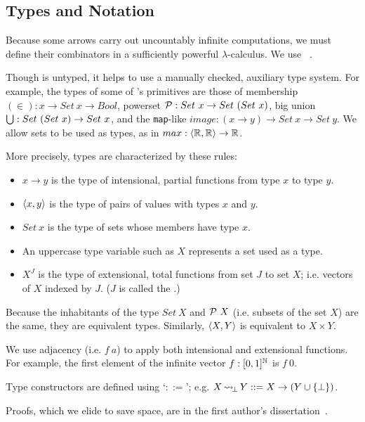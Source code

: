 \documentclass{llncs}
\newcommand{\arrow}{\rightsquigarrow}
\DeclareMathOperator{\botto}{{\arrow\mspace{-3mu}}_\bot}
\begin{document}
\subsection{Types and Notation}

Because some arrows carry out uncountably infinite computations, we must define their combinators in a sufficiently powerful $\lambda$-calculus.
We use \lzfclang~\cite{cit:toronto-2012flops-lzfc}.

Though \lzfclang is untyped, it helps to use a manually checked, auxiliary type system.
For example, the types of some of \lzfclang's primitives are those of membership $(\in) : x \to Set~x \to Bool$, powerset $\mathcal{P} : Set~x \to Set~(Set~x)$, big union $\textstyle\bigcup : Set~(Set~x) \to Set~x$, and the \texttt{map}-like $image : (x \to y) \to Set~x \to Set~y$.
We allow sets to be used as types, as in $max : \langle{\mathbb{R},\mathbb{R}}\rangle \to \mathbb{R}$.

More precisely, types are characterized by these rules:
\begin{itemize}
	\item $x \to y$ is the type of intensional, partial functions from type $x$ to type $y$.
	\item $\langle{x,y}\rangle$ is the type of pairs of values with types $x$ and $y$.
	\item $Set~x$ is the type of sets whose members have type $x$.
	\item An uppercase type variable such as $X$ represents a set used as a type.
	\item $X^J$ is the type of extensional, total functions from set $J$ to set $X$; i.e. vectors of $X$ indexed by $J$. ($J$ is called the .)
\end{itemize}
Because the inhabitants of the type $Set~X$ and $\mathcal{P}~X$ (i.e. subsets of the set $X$) are the same, they are equivalent types.
Similarly, $\langle{X,Y}\rangle$ is equivalent to $X \times Y$.

We use adjacency (i.e. $f~a$) to apply both intensional and extensional functions.
For example, the first element of the infinite vector $f : [0,1]^{\mathbb{N}}$ is $f~0$.

Type constructors are defined using `$::=$'; e.g. $X \botto Y ::= X \to (Y \u \set{\bot})$.

Proofs, which we elide to save space, are in the first author's dissertation~\cite{cit:toronto-thesis}.

\end{document}
